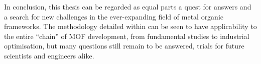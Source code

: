 In conclusion, this thesis can be regarded as equal parts a quest for
answers and a search for new challenges in the ever-expanding 
field of metal organic frameworks. The methodology detailed within
can be seen to have applicability to the entire ``chain'' of
MOF development, from fundamental studies to industrial optimisation,
but many questions still remain to be answered, trials for future
scientists and engineers alike.

\pagebreak

